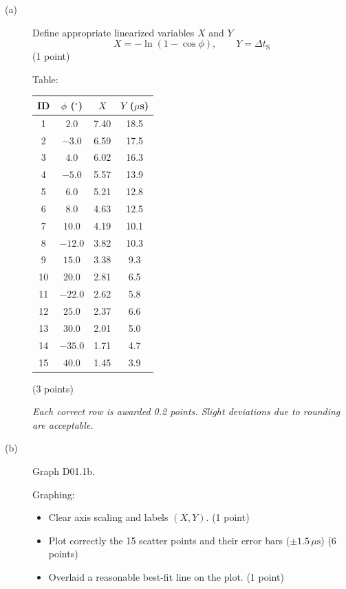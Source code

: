 \begin{description}
\item[(a)] Define appropriate linearized variables $X$ and $Y$
  \[
  X = -\ln(1 - \cos\phi), \qquad Y = \Delta t_{\mathrm{S}}
  \]
  \hfill(1 point)

  Table:
  \begin{center}
  \begin{tabular}{cccc}
  \toprule
  ID & $\phi$ ($^\circ$) & $X$ & $Y$ ($\mu$s) \\
  \midrule
  1  & $2.0$   & 7.40 & 18.5 \\
  2  & $-3.0$  & 6.59 & 17.5 \\
  3  & $4.0$   & 6.02 & 16.3 \\
  4  & $-5.0$  & 5.57 & 13.9 \\
  5  & $6.0$   & 5.21 & 12.8 \\
  6  & $8.0$   & 4.63 & 12.5 \\
  7  & $10.0$  & 4.19 & 10.1 \\
  8  & $-12.0$ & 3.82 & 10.3 \\
  9  & $15.0$  & 3.38 & 9.3 \\
  10 & $20.0$  & 2.81 & 6.5 \\
  11 & $-22.0$ & 2.62 & 5.8 \\
  12 & $25.0$  & 2.37 & 6.6 \\
  13 & $30.0$  & 2.01 & 5.0 \\
  14 & $-35.0$ & 1.71 & 4.7 \\
  15 & $40.0$  & 1.45 & 3.9 \\
  \bottomrule
  \end{tabular}
  \end{center}
  \hfill(3 points)

  \emph{Each correct row is awarded 0.2 points. Slight deviations due to
  rounding are acceptable.}

\item[(b)]
  Graph D01.1b.

  Graphing:
  \begin{itemize}
  \item Clear axis scaling and labels $(X, Y)$. \hfill(1 point)
  \item Plot correctly the 15 scatter points and their error bars
    ($\pm 1.5\,\mu\mathrm{s}$) \hfill(6 points)
  \item Overlaid a reasonable best-fit line on the plot. \hfill(1 point)
  \end{itemize}


\end{description}
